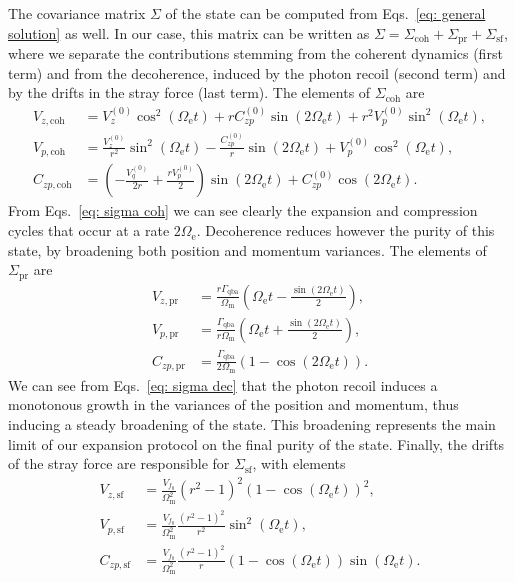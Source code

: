 \documentclass[aps, 
reprint, 
notitlepage,  superscriptaddress, 
onecolumn]{revtex4-1}
\newcommand{\<}{\langle}
\renewcommand{\>}{\rangle}
\newcommand{\Om}{\Omega_\mathrm{m}}
\newcommand{\Gqba}{\Gamma_\text{qba}}
\newcommand{\Oe}{\Omega_\mathrm{e}}
\begin{document}
The covariance matrix $\Sigma$ of the state can be computed from Eqs.~\eqref{eq: general solution} as well.
In our case, this matrix can be written as $\Sigma=\Sigma_\mathrm{coh}+\Sigma_\mathrm{pr} + \Sigma_\mathrm{sf}$, where we separate the contributions stemming from the coherent dynamics (first term) and from the decoherence, induced by the photon recoil (second term) and by the drifts in the stray force (last term).
%
The elements of $\Sigma_\mathrm{coh}$ are
%
\begin{subequations}
    \label{eq: sigma coh}
    \begin{align}
    V_{z,\mathrm{coh}} &= V_z^{(0)} \cos^2(\Oe t) + r C_{zp}^{(0)}\sin(2\Oe t) + r^2 V_p^{(0)} \sin^2(\Oe t), \\
V_{p,\mathrm{coh}} &= \frac{V_z^{(0)}}{r^2}\sin^2(\Oe t) - \frac{C_{zp}^{(0)}}{r} \sin(2\Oe t) + V_p^{(0)}\cos^2(\Oe t), \\
%
%
C_{zp, \mathrm{coh}} &= \left( -\frac{V_q^{(0)}}{2r} + \frac{r V_p^{(0)}}{2} \right) \sin(2 \Oe t) + C_{zp}^{(0)}\cos(2\Oe t).
    \end{align}
\end{subequations}
%
From Eqs.~\eqref{eq: sigma coh} we can see clearly the expansion and compression cycles that occur at a rate $2\Oe$. 
Decoherence reduces however the purity of this state, by broadening both position and momentum variances.
The elements of $\Sigma_\mathrm{pr}$ are
%
\begin{subequations}
\label{eq: sigma dec}
\begin{align}
    V_{z,\mathrm{pr}} &=  \frac{r \Gqba}{\Om}\left( \Oe t - \frac{\sin(2\Oe t)}{2} \right),\\
    V_{p,\mathrm{pr}} &=  \frac{\Gqba}{r \Om}\left( \Oe t + \frac{\sin(2\Oe t)}{2} \right),\\
    C_{zp, \mathrm{pr}} &= \frac{\Gqba}{2 \Om}\left( 1 - \cos(2\Oe t) \right).
\end{align}
\end{subequations}
%
We can see from Eqs.~\eqref{eq: sigma dec} that the photon recoil induces a monotonous growth in the variances of the position and momentum, thus inducing a steady broadening of the state. This broadening represents the main limit of our expansion protocol on the final purity of the state. 
%
Finally, the drifts of the stray force are responsible for $\Sigma_\mathrm{sf}$, with elements
%
\begin{subequations}
\label{eq: sigma f}
    \begin{align}
        V_{z,\mathrm{sf}} &=   \frac{V_{f_0}}{\Om^2}(r^2-1)^2\left( 1-\cos(\Oe t)\right)^2, \\
        V_{p,\mathrm{sf}} &=  \frac{V_{f_0}}{\Om^2}\frac{(r^2-1)^2}{r^2} \sin^2(\Oe t), \\
        C_{zp,\mathrm{sf}} &=   \frac{V_{f_0}}{\Om^2}\frac{(r^2-1)^2}{r} \left(1-\cos(\Oe t)\right)\sin(\Oe t).
    \end{align}
\end{subequations}
\end{document}
